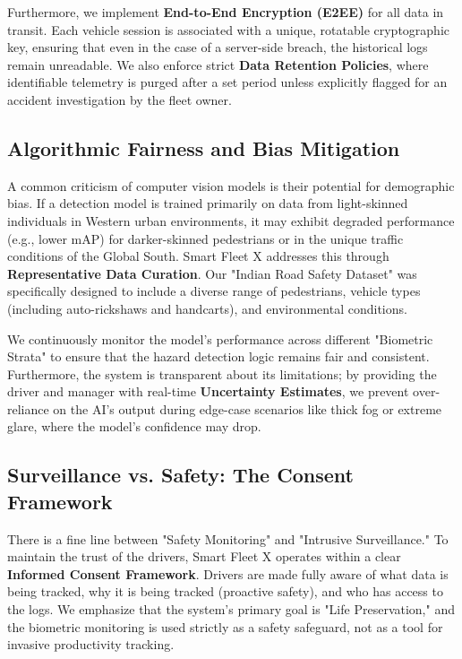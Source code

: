 \documentclass[conference]{IEEEtran}
\begin{document}
Furthermore, we implement \textbf{End-to-End Encryption (E2EE)} for all data in transit. Each vehicle session is associated with a unique, rotatable cryptographic key, ensuring that even in the case of a server-side breach, the historical logs remain unreadable. We also enforce strict \textbf{Data Retention Policies}, where identifiable telemetry is purged after a set period unless explicitly flagged for an accident investigation by the fleet owner.

\subsection{Algorithmic Fairness and Bias Mitigation}
A common criticism of computer vision models is their potential for demographic bias. If a detection model is trained primarily on data from light-skinned individuals in Western urban environments, it may exhibit degraded performance (e.g., lower mAP) for darker-skinned pedestrians or in the unique traffic conditions of the Global South. Smart Fleet X addresses this through \textbf{Representative Data Curation}. Our "Indian Road Safety Dataset" was specifically designed to include a diverse range of pedestrians, vehicle types (including auto-rickshaws and handcarts), and environmental conditions.

We continuously monitor the model's performance across different "Biometric Strata" to ensure that the hazard detection logic remains fair and consistent. Furthermore, the system is transparent about its limitations; by providing the driver and manager with real-time \textbf{Uncertainty Estimates}, we prevent over-reliance on the AI's output during edge-case scenarios like thick fog or extreme glare, where the model's confidence may drop.

\subsection{Surveillance vs. Safety: The Consent Framework}
There is a fine line between "Safety Monitoring" and "Intrusive Surveillance." To maintain the trust of the drivers, Smart Fleet X operates within a clear \textbf{Informed Consent Framework}. Drivers are made fully aware of what data is being tracked, why it is being tracked (proactive safety), and who has access to the logs. We emphasize that the system's primary goal is "Life Preservation," and the biometric monitoring is used strictly as a safety safeguard, not as a tool for invasive productivity tracking.
\end{document}
